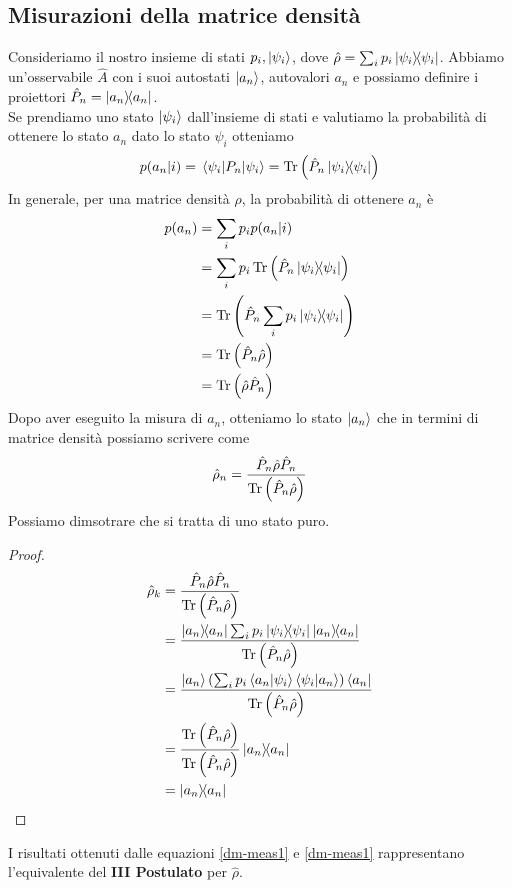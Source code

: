 \subsection{Misurazioni della matrice densità}
Consideriamo il nostro insieme di stati ${p_i, \ket{\psi_i}}$, dove $\hat \rho = \sum_i p_i \op{\psi_i}{\psi_i}$. Abbiamo un'osservabile $\hat A$ con i suoi autostati $\ket{a_n}$, autovalori $a_n$ e possiamo definire i proiettori $\hat P_n = \op{a_n}{a_n}$.\\
Se prendiamo uno stato $\ket{\psi_i}$ dall'insieme di stati e valutiamo la probabilità di ottenere lo stato $a_n$ dato lo stato $\psi_i$ otteniamo
\begin{equation*}
    p(a_n|i)=\mel{\psi_i}{P_n}{\psi_i}=\Tr\left(\hat P_n \op{\psi_i}{\psi_i}\right)
\end{equation*}
In generale, per una matrice densità $\rho$, la probabilità di ottenere $a_n$ è
\begin{equation}\label{dm-meas1}
    \begin{aligned}
        p(a_n) &= \sum_i p_i p(a_n|i) \\
               &= \sum_i p_i \Tr\left(\hat P_n \op{\psi_i}{\psi_i}\right) \\
               &= \Tr \left(\hat P_n \sum_i p_i \op{\psi_i}{\psi_i}\right) \\
               &= \Tr \left(\hat P_n \hat \rho\right) \\
               &= \Tr \left(\hat \rho \hat P_n \right)
    \end{aligned}
\end{equation}
Dopo aver eseguito la misura di $a_n$, otteniamo lo stato $\ket{a_n}$ che in termini di matrice densità possiamo scrivere come
\begin{equation}\label{dm-meas2}
    \hat \rho_n = \frac{\hat P_n \hat \rho \hat P_n}{\Tr \left(\hat P_n \hat \rho \right)}
\end{equation}
Possiamo dimsotrare che si tratta di uno stato puro.
\begin{proof}
    \begin{equation*}
        \begin{aligned}
            \hat \rho_k &= \frac{\hat P_n \hat \rho \hat P_n}{\Tr \left(\hat P_n \hat \rho \right)} \\
                        &= \frac{\op{a_n}{a_n}\sum_i p_i \op{\psi_i}{\psi_i} \op{a_n}{a_n}}{\Tr \left(\hat P_n \hat \rho\right)} \\
                        &= \frac{\ket{a_n}\left(\sum_i p_i \ip{a_n}{\psi_i}\ip{\psi_i}{a_n}\right)\bra{a_n}}{\Tr \left(\hat P_n \hat \rho\right)} \\
                        &= \frac{\Tr \left(\hat P_n \hat \rho\right)}{\Tr \left(\hat P_n \hat \rho\right)}\op{a_n}{a_n} \\
                        &= \op{a_n}{a_n}
        \end{aligned}
    \end{equation*}
\end{proof}
\noindent I risultati ottenuti dalle equazioni \eqref{dm-meas1} e \eqref{dm-meas1} rappresentano l'equivalente del \textbf{III Postulato} per $\hat \rho$.